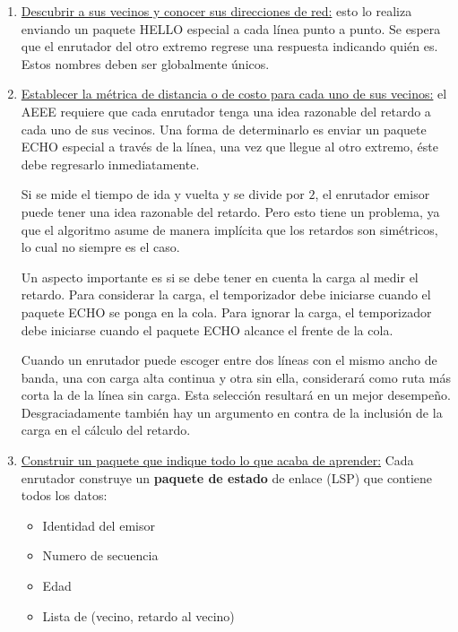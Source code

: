\documentclass[10pt,a4paper]{report}
\begin{document}
	\begin{enumerate}
		\item \underline{Descubrir a sus vecinos y conocer sus direcciones de red:} esto lo realiza enviando un paquete HELLO especial a cada línea punto a punto. Se espera que el 	enrutador del otro extremo regrese una respuesta indicando quién es. Estos nombres deben ser globalmente únicos.

		\item \underline{Establecer la métrica de distancia o de costo para cada uno de sus vecinos:} el AEEE requiere que cada enrutador tenga una idea razonable del retardo a cada uno de sus vecinos. Una forma de determinarlo es enviar un paquete ECHO especial a través de la línea, una vez que llegue al otro extremo, éste debe regresarlo inmediatamente.

		\par Si se mide el tiempo de ida y vuelta y se divide por $2$, el enrutador emisor 
		puede tener una idea razonable del retardo. Pero esto tiene un problema, ya que 
		el algoritmo asume de manera implícita que los retardos son simétricos, lo cual no 
		siempre es el caso.

		\par Un aspecto importante es si se debe tener en cuenta la carga al medir el 
		retardo. Para considerar la carga, el temporizador debe iniciarse cuando el paquete 
		ECHO se ponga en la cola. Para ignorar la carga, el temporizador debe iniciarse 
		cuando el paquete ECHO alcance el frente de la cola.
		
		\par Cuando un enrutador puede escoger entre dos líneas con el mismo ancho de 
		banda, una con carga alta continua y otra sin ella, considerará como ruta más 
		corta la de la línea sin carga. Esta selección resultará en un mejor desempeño. 		
		Desgraciadamente también hay un argumento en contra de la inclusión de la carga 
		en el cálculo del retardo.

		\item \underline{Construir un paquete que indique todo lo que acaba de aprender:} Cada enrutador construye un \textbf{paquete de estado} de enlace (LSP) que contiene todos los datos:
		\begin{itemize}
			\item Identidad del emisor
			\item Numero de secuencia
			\item Edad
			\item Lista de (vecino, retardo al vecino)
		\end{itemize}
		

\end{enumerate}
\end{document}
